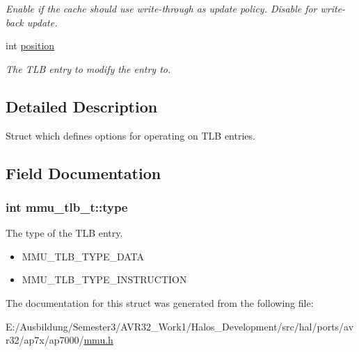 \begin{CompactItemize}
\begin{CompactList}\small\item\em Enable if the cache should use write-through as update policy. Disable for write-back update. \item\end{CompactList}\item 
\hypertarget{structmmu__tlb__t_c3347ab70ce218cf7abfa442a813c88a}{
int \hyperlink{structmmu__tlb__t_c3347ab70ce218cf7abfa442a813c88a}{position}}
\label{structmmu__tlb__t_c3347ab70ce218cf7abfa442a813c88a}

\begin{CompactList}\small\item\em The TLB entry to modify the entry to. \item\end{CompactList}\end{CompactItemize}


\subsection{Detailed Description}
Struct which defines options for operating on TLB entries. 

\subsection{Field Documentation}
\hypertarget{structmmu__tlb__t_6bb98a71abde4276e7f57bb8d35492cb}{
\subsubsection[{type}]{\setlength{\rightskip}{0pt plus 5cm}int {\bf mmu\_\-tlb\_\-t::type}}}
\label{structmmu__tlb__t_6bb98a71abde4276e7f57bb8d35492cb}


The type of the TLB entry. 

\begin{itemize}
\item MMU\_\-TLB\_\-TYPE\_\-DATA \item MMU\_\-TLB\_\-TYPE\_\-INSTRUCTION \end{itemize}


The documentation for this struct was generated from the following file:\begin{CompactItemize}
\item 
E:/Ausbildung/Semester3/AVR32\_\-Work1/Halos\_\-Development/src/hal/ports/avr32/ap7x/ap7000/\hyperlink{mmu_8h}{mmu.h}\end{CompactItemize}
